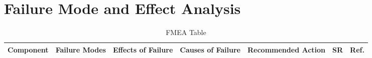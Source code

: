 \documentclass{article}
\begin{document}
	\section{Failure Mode and Effect Analysis}
	
	\newcommand\newComponent{\stepcounter{componentNum}\thecomponentNum}
	
		\def\arraystretch{1.5}%
		\small %
		\begin{longtable}{ | l | p{2.5cm} | p{3cm} | p{3cm} | p{3.5cm} | p{1.5cm} | c | }
			\caption{FMEA Table\label{long}}\\
			\hline
			Component & Failure Modes & Effects of Failure & Causes of Failure & Recommended Action & SR & Ref.\\
			\hline
			

\end{longtable}
\end{document}
